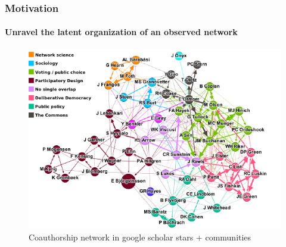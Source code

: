 \documentclass{beamer}\usepackage[]{graphicx}\usepackage[]{color}
\begin{document}
\begin{frame}
  \frametitle{Motivation}
  \framesubtitle{Unravel the latent organization of an observed network}

  \begin{figure}
    \centering
    \includegraphics[width=.8\textwidth]{figures/scholar_network}
    \caption{\small Coauthorship network in google scholar
      \alert{stars + communities}}
  \end{figure}
\end{frame}
\end{document}
